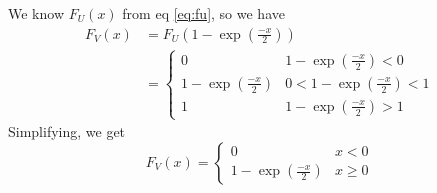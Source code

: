 \documentclass[journal, 12pt, twocolumn]{IEEEtran}
\begin{document}
\begin{enumerate}[label=\arabic{section}.\arabic*]
        We know $F_U(x)$ from eq \eqref{eq:fu}, so we have
        \begin{align}
            F_V(x) &= F_U \left(1 - \exp \left(\frac{-x}{2}\right)\right) \\
            &= \begin{cases}
                0 & 1 - \exp \left(\frac{-x}{2}\right) < 0 \\
                1 - \exp \left(\frac{-x}{2}\right) & 0 < 1 - \exp \left(\frac{-x}{2}\right) < 1 \\
                1 & 1 - \exp \left(\frac{-x}{2}\right) > 1
            \end{cases}
        \end{align}
        Simplifying, we get
        \begin{equation}
            F_V(x) = \begin{cases}
                0 & x < 0 \\
                1 - \exp \left(\frac{-x}{2}\right) & x \geq 0
            \end{cases}
        \end{equation}
\end{enumerate}
\end{document}
